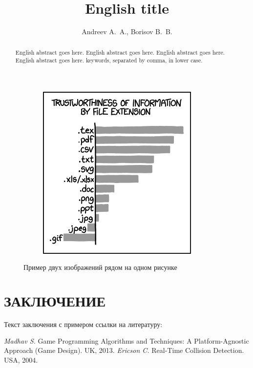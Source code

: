 \documentclass[intlimits,twoside,a4paper,11pt]{article}
\begin{document}
\begin{figure}[H]
\begin{subfigure}[t]{50mm}
		\includegraphics[width=\textwidth]{xkcd1301.png}
		\subcaption{} %
		\label{fig-example-2b}
	\end{subfigure}
	\caption{Пример двух изображений рядом на одном рисунке} \label{fig-example-2}
\end{figure}

\section{ЗАКЛЮЧЕНИЕ}
Текст заключения с примером ссылки на литературу:~\cite{lib-1,lib-2}

\begin{thebibliography}{9}
 {\it Madhav S.} Game Programming Algorithms and Techniques: A Platform-Agnostic Approach (Game Design). UK, 2013. 
 {\it Ericson C.} Real-Time Collision Detection. USA, 2004.
\end{thebibliography}

\translatedpart

\title{English title}
\author{Andreev A.~A., Borisov B.~B.}

\maketranslatedtitle

\begin{abstract}
English abstract goes here. English abstract goes here. English abstract goes here. English abstract goes here.
\keywords keywords, separated by comma, in lower case.
\end{abstract}

\makekioauthors
\end{document}
